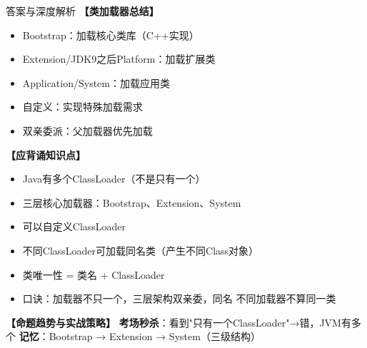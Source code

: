 \documentclass[12pt, a4paper]{ctexart}
\begin{document}
\begin{enumerate}[label=\textbf{\arabic*.}]
\begin{bluebox}{答案与深度解析}
		      \textbf{【类加载器总结】}
		      \begin{itemize}[label={}, nosep]
			      \item Bootstrap：加载核心类库（C++实现）
			      \item Extension/JDK9之后Platform：加载扩展类
			      \item Application/System：加载应用类
			      \item 自定义：实现特殊加载需求
			      \item 双亲委派：父加载器优先加载
		      \end{itemize}

		      \textbf{【应背诵知识点】}
		      \begin{itemize}[label={}, nosep]
			      \item Java有多个ClassLoader（不是只有一个）
			      \item 三层核心加载器：Bootstrap、Extension、System
			      \item 可以自定义ClassLoader
			      \item 不同ClassLoader可加载同名类（产生不同Class对象）
			      \item 类唯一性 = 类名 + ClassLoader
			      \item 口诀：加载器不只一个，三层架构双亲委，同名 不同加载器不算同一类
		      \end{itemize}

		      \textbf{【命题趋势与实战策略】}
		      \textbf{考场秒杀}：看到"只有一个ClassLoader"→错，JVM有多个
		      \textbf{记忆}：Bootstrap → Extension → System（三级结构）
	      \end{bluebox}

\end{enumerate}
\end{document}
